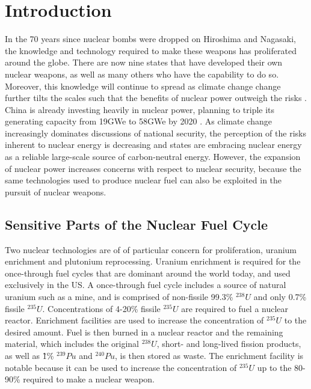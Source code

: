\section{Introduction}
\label{s_motive}

In the 70 years since nuclear bombs were dropped on Hiroshima and Nagasaki, the knowledge and technology required to make these weapons has proliferated around the globe. There are now nine states that have developed their own nuclear weapons, as well as many others who have the capability to do so\cite{feiveson_unmaking_2014}.  Moreover, this knowledge will continue to spread as climate change change further tilts the scales such that the benefits of nuclear power outweigh the risks \cite{mooney_why_2014}.  China is already investing heavily in nuclear power, planning to triple its generating capacity from 19GWe to 58GWe by 2020  \cite{_china_2014}.  As climate change increasingly dominates discussions of national security, the perception of the risks inherent to nuclear energy is decreasing and states are embracing nuclear energy as a reliable large-scale source of carbon-neutral energy.  However, the expansion of nuclear power increases concerns with respect to nuclear security, because the same technologies used to produce nuclear fuel can also be exploited in the pursuit of nuclear weapons.


\subsection{Sensitive Parts of the Nuclear Fuel Cycle}

Two nuclear technologies are of of particular concern for proliferation, uranium enrichment and plutonium reprocessing.  Uranium enrichment is required for the once-through fuel cycles that are dominant around the world today, and used exclusively in the US.  A once-through fuel cycle includes a source of natural uranium such as a mine, and is comprised of non-fissile 99.3\% $^{238}U$ and only 0.7\% fissile $^{235}U$. Concentrations of 4-20\% fissile $^{235}U$ are required to fuel a nuclear reactor. Enrichment facilities are used to increase the concentration of $^{235}U$ to the desired amount.  Fuel is then burned in a nuclear reactor and the remaining material, which includes the original $^{238}U$, short- and long-lived fission products, as well as \~1\% $^{239}Pu$ and $^{240}Pu$, is then stored as waste.  The enrichment facility is notable because it can be used to increase the concentration of $^{235}U$ up to the 80-90\% required to make a nuclear weapon\cite{_military_2014}.

